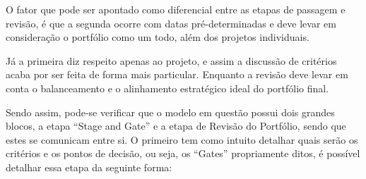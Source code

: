 \documentclass[12pt,a4paper,ruledheader,tocpage=prefix,floatnumber=continuous,pagestart=folhaderosto,font=times]{abnt}
\begin{document}
O fator que pode ser apontado como diferencial entre as etapas de passagem e revisão, é que a segunda ocorre com datas pré-determinadas e deve levar em 
consideração o portfólio como um todo, além dos projetos individuais. 

Já a primeira diz respeito apenas ao projeto, e assim a discussão de critérios acaba por ser feita de forma mais particular. Enquanto a revisão deve 
levar em conta o balanceamento e o alinhamento estratégico ideal do portfólio final.

Sendo assim, pode-se verificar que o modelo em questão possui dois grandes blocos, a etapa ``Stage and Gate'' e a etapa de Revisão do Portfólio, sendo que
estes se comunicam entre si. O primeiro tem como intuito detalhar quais serão os critérios e os pontos de decisão, ou seja, os ``Gates'' propriamente ditos,
é possível detalhar essa etapa da seguinte forma:
\end{document}
